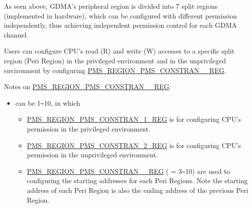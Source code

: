 \documentclass[main\_\_EN.tex]{subfiles}
\begin{document}
As seen above, GDMA's peripheral region is divided into 7 split regions (implemented in hardware), which can be configured with different permission independently, thus achieving independent permission control for each GDMA channel.

Users can configure CPU's read (R) and write (W) accesses to a specific split region (Peri Region) in the privileged environment and in the unprivileged environment by configuring \hyperref[regdesc:PMSREGIONPMSCONSTRAIN1REG]{PMS\_REGION\_PMS\_CONSTRAN\_\_REG}.

Notes on \hyperref[regdesc:PMSREGIONPMSCONSTRAIN1REG]{PMS\_REGION\_PMS\_CONSTRAN\_\_REG}:
\begin{itemize}
    \item {} can be 1\verb+~+10, in which    \begin{itemize}
        \item \hyperref[regdesc:PMSREGIONPMSCONSTRAIN1REG]{PMS\_REGION\_PMS\_CONSTRAN\_1\_REG} is for configuring CPU's permission in the privileged environment.
        \item \hyperref[regdesc:PMSREGIONPMSCONSTRAIN2REG]{PMS\_REGION\_PMS\_CONSTRAN\_2\_REG} is for configuring CPU's permission in the unprivileged environment.
        \item \hyperref[regdesc:PMSREGIONPMSCONSTRAIN3REG]{PMS\_REGION\_PMS\_CONSTRAN\_\_REG} ( = 3\verb+~+10) are used to configuring the starting addresses for each Peri Regions. Note the starting address of each Peri Region is also the ending address of the previous Peri Region.
    \end{itemize}
\end{itemize}
\end{document}

